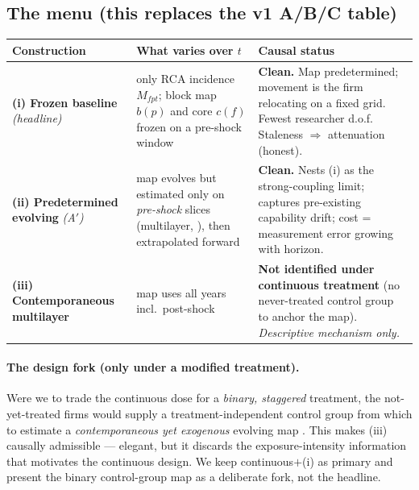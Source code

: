 \documentclass[11pt]{article}
\begin{document}
\subsection{The menu (this replaces the v1 A/B/C table)}
\begin{center}\small
\begin{tabular}{@{}p{2.6cm}p{4.6cm}p{5.7cm}@{}}
\toprule
\textbf{Construction} & \textbf{What varies over $t$} & \textbf{Causal status} \\
\midrule
\textbf{(i) Frozen baseline} \emph{(headline)} &
only RCA incidence $M_{fpt}$; block map $b(p)$ and core $c(f)$ frozen on a
pre-shock window &
\textbf{Clean.} Map predetermined; movement is the firm relocating on a fixed grid.
Fewest researcher d.o.f. Staleness $\Rightarrow$ attenuation (honest). \\[2pt]
\textbf{(ii) Predetermined evolving} \emph{(A$'$)} &
map evolves but estimated only on \emph{pre-shock} slices (multilayer,
\citealp{mucha2010}), then extrapolated forward &
\textbf{Clean.} Nests (i) as the strong-coupling limit; captures pre-existing
capability drift; cost = measurement error growing with horizon. \\[2pt]
\textbf{(iii) Contemporaneous multilayer} &
map uses all years incl.\ post-shock &
\textbf{Not identified under continuous treatment} (no never-treated control group
to anchor the map). \emph{Descriptive mechanism only.} \\
\bottomrule
\end{tabular}
\end{center}

\paragraph{The design fork (only under a modified treatment).} Were we to trade the
continuous dose for a \emph{binary, staggered} treatment, the not-yet-treated firms
would supply a treatment-independent control group from which to estimate a
\emph{contemporaneous yet exogenous} evolving map \citep[control-group construction
of][]{callawaysantanna2021}. This makes (iii) causally admissible --- elegant, but
it discards the exposure-intensity information that motivates the continuous design.
We keep continuous$+$(i) as primary and present the binary control-group map as a
deliberate fork, not the headline.
\end{document}
